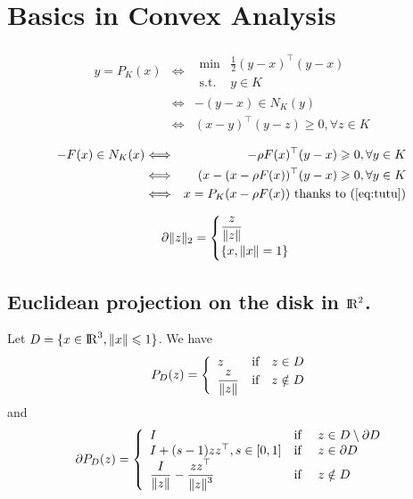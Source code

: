 \clearpage
\appendix

\section{Basics in Convex Analysis}
\label{Sec:Ann:ConvexAnalysis}
\begin{eqnarray}
y = P_K(x) & \Longleftrightarrow &
\begin{array}{ll}
  \min &\frac 1 2 (y-x)^\top (y-x ) \\
  \text {s.t. } & y \in K
\end{array}
\\
& \Longleftrightarrow & - (y-x) \in N_K(y) \\
& \Longleftrightarrow & (x-y)^\top(y-z) \geq 0, \forall z \in K 
\label{eq:tutu}
\end{eqnarray}

\begin{eqnarray}
-F(x) \in N_K(x) & \Longleftrightarrow & -\rho F(x)^\top(y-x) \geq 0, \forall y \in K\\
& \Longleftrightarrow &  (x-(x - \rho F(x))^\top(y-x) \geq 0, \forall y \in K \\
& \Longleftrightarrow &  x = P_K(x- \rho F(x)) \text{ thanks to (\ref{eq:tutu})} 
\end{eqnarray}

\begin{equation}
  \label{eq:sub-norm}
  \partial \|z\|_2 =
  \begin{cases}
      \Frac z {\|z\|}\\
      \{x, \|x\|=1 \}
    \end{cases}
\end{equation}
\subsection{Euclidean projection on the disk  in $\RR^2$.}
Let $D=\{x \in \RR^3, \|x\| \leq 1\}$. We have 
\begin{equation}
  \label{eq:projD}
  P_{D}(z) =\left\{
  \begin{array}{lcl}
    z &\text{if}& z \in D \\
    \Frac {z} {\|z\|}& \text{if}&z \notin D
    \end{array}\right. 
  \end{equation}
 and
\begin{equation}
  \label{eq:sub-projD}
  \partial P_{D}(z) =\left\{
  \begin{array}{lcl}
   I &\text{if }& z \in D \setminus \partial D \\
   I + (s-1)z z^\top , s\in [0,1]   &\text{if }& z \in  \partial D \\
   \Frac I {\|z\|} - \Frac{z z^\top}{\|z\|^3} &\text{if }& z \notin D  
   \end{array}\right. 
\end{equation}


